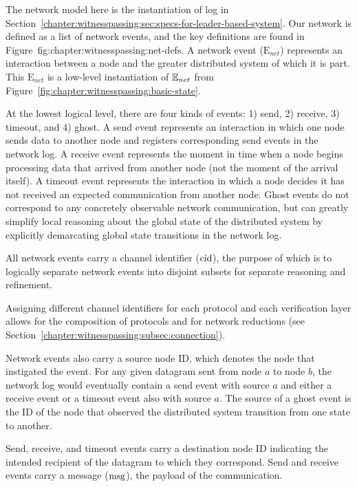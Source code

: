 The network model here is the instantiation of log in
 Section~\ref{chapter:witnesspassing:sec:specs-for-leader-based-system}. Our network is defined as a list of
network events, and the key definitions are found in Figure~{fig:chapter:witnesspassing:net-defs}. A
network event ($\mathrm{E}_{net}$) represents an interaction between a node and
the greater distributed system of which it is part. This $\mathrm{E}_{net}$ is a
low-level instantiation of ${\mathbb{E}_{net}}$ from Figure~\ref{fig:chapter:witnesspassing:basic-state}.

At the lowest logical level, there are four kinds of events: 1) send, 2) receive,
3) timeout, and 4) ghost. A send event represents an interaction in which one
node sends data to another node and registers corresponding send events in the
network log. A receive event represents the moment in time when a node begins
processing data that arrived from another node (not the moment of the arrival
itself). A timeout event represents the interaction in which a node decides it
has not received an expected communication from another node. Ghost events do
not correspond to any concretely observable network communication, but can
greatly simplify local reasoning about the global state of the distributed
system by explicitly demarcating global state transitions in the network log.

All network events carry a channel identifier ($\mathrm{cid}$), the purpose of which is
to logically separate network events into disjoint subsets for separate
reasoning and refinement.  Assigning different channel identifiers for each
protocol and each verification layer allows for the composition of protocols and
for network reductions (see Section~\ref{chapter:witnesspassing:subsec:connection}).

Network events also carry a source node ID, which denotes the node that
instigated the event. For any given datagram sent from node $a$ to node $b$, the
network log would eventually contain a send event with source $a$ and either a
receive event or a timeout event also with source $a$. The source of a ghost
event is the ID of the node that observed the distributed system transition from
one state to another.  Send, receive, and timeout events carry a
destination node ID indicating the intended recipient of the datagram to which
they correspond. Send and receive events carry a message ($\mathrm{msg}$), the payload
of the communication.

